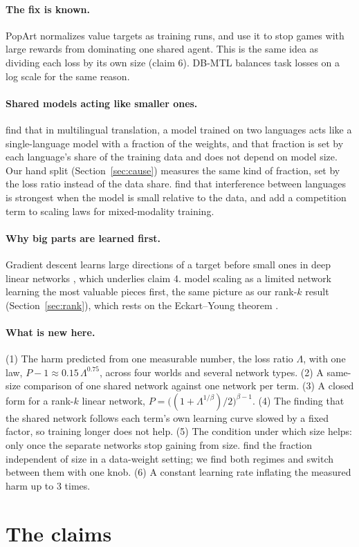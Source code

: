 \documentclass[11pt]{article}
\newcommand{\Lam}{\Lambda}
\newcommand{\para}[1]{\paragraph{#1}}
\begin{document}
\para{The fix is known.} PopArt \citep{vanhasselt2016popart} normalizes value targets as training runs, and \citet{hessel2019popart} use it to stop games with large rewards from dominating one shared agent. This is the same idea as dividing each loss by its own size (claim 6). DB-MTL \citep{lin2023dbmtl} balances task losses on a log scale for the same reason.

\para{Shared models acting like smaller ones.} \citet{fernandes2023scaling} find that in multilingual translation, a model trained on two languages acts like a single-language model with a fraction of the weights, and that fraction is set by each language's share of the training data and does not depend on model size. Our hand split (Section~\ref{sec:cause}) measures the same kind of fraction, set by the loss ratio instead of the data share. \citet{shaham2023causes} find that interference between languages is strongest when the model is small relative to the data, and \citet{aghajanyan2023scaling} add a competition term to scaling laws for mixed-modality training.

\para{Why big parts are learned first.} Gradient descent learns large directions of a target before small ones in deep linear networks \citep{saxe2014exact,lampinen2019analytic}, which underlies claim 4. \citet{michaud2023quantization} model scaling as a limited network learning the most valuable pieces first, the same picture as our rank-$k$ result (Section~\ref{sec:rank}), which rests on the Eckart--Young theorem \citep{eckart1936approximation}.

\para{What is new here.}
(1) The harm predicted from one measurable number, the loss ratio $\Lam$, with one law, $P-1\approx 0.15\,\Lam^{0.75}$, across four worlds and several network types.
(2) A same-size comparison of one shared network against one network per term.
(3) A closed form for a rank-$k$ linear network, $P = \big((1+\Lam^{1/\beta})/2\big)^{\beta-1}$.
(4) The finding that the shared network follows each term's own learning curve slowed by a fixed factor, so training longer does not help.
(5) The condition under which size helps: only once the separate networks stop gaining from size. \citet{fernandes2023scaling} find the fraction independent of size in a data-weight setting; we find both regimes and switch between them with one knob.
(6) A constant learning rate inflating the measured harm up to 3 times.

\section{The claims}
\label{sec:claims}
\end{document}
